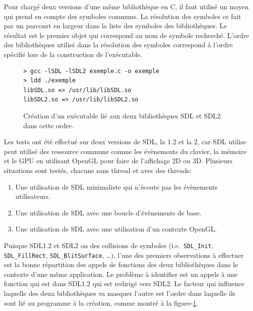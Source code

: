 Pour chargé deux versions d'une même bibliothèque en C, il faut utilisé un moyen
qui prend en compte des symboles communs. La résolution des symboles ce fait
par un parcourt en largeur dans la liste des symboles des bibliothèques.
Le résultat est le premier objet qui correspond au nom de symbole recherché.
L'ordre des bibliothèques utilisé dans la résolution des symboles correspond
à l'ordre spécifié lors de la construction de l'exécutable.
\begin{center}
\begin{figure}[ht]
\begin{lstlisting}[frame=single]
> gcc -lSDL -lSDL2 exemple.c -o exemple
> ldd ./exemple
libSDL.so => /usr/lib/libSDL.so
libSDL2.so => /usr/lib/libSDL2.so
\end{lstlisting}
\caption{Création d'un exécutable lié aux deux bibliothèques
SDL et SDL2 dans cette ordre.}
\label{fig:sdl_mask_sdl2}
\end{figure}
\end{center}
Les tests ont été effectué sur deux versions de SDL, la 1.2 et la 2, car SDL utilise
peut utilisé des ressource commune comme les évènements du clavier, la mémoire et
le GPU en utilisant OpenGL pour faire de l'affichage 2D ou 3D.
Plusieurs situations sont testés, chacune sans thread et avec des threads:
\begin{enumerate}
    \item Une utilisation de SDL minimaliste qui n'écoute pas les évènements utilisateurs.
    \item Une utilisation de SDL avec une boucle d'évènements de base.
    \item Une utilisation de SDL avec une utilisation d'un contexte OpenGL.
\end{enumerate}

Puisque SDL1.2 et SDL2 on des collisions de symboles (i.e.\ \verb+SDL_Init+, \verb+SDL_FillRect+, \verb+SDL_BlitSurface+,
\dots), l'une des premiers observations à effectuer est la bonne répartition des appels de fonctions des deux bibliothèques
dans le contexte d'une même application. Le problème à identifier est un appels à une fonction qui est dans SDL1.2 qui est redirigé
vers SDL2. Le facteur qui influence laquelle des deux bibliothèques va masquer l'autre est l'ordre dans laquelle
ils sont lié au programme à la création, comme montré à la figure-\ref{fig:sdl_mask_sdl2}.


